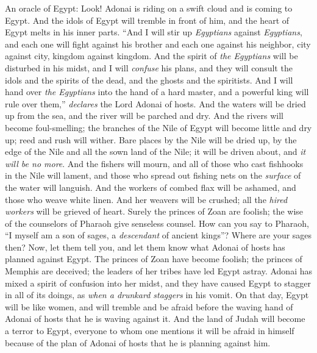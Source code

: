 \begin{biblechapter} %
 An oracle of Egypt:
\verse Look! Adonai is riding on a swift cloud 
and is coming to Egypt. 
And the idols of Egypt will tremble in front of him, 
and the heart of Egypt melts in his inner parts.
\verse “And I will stir up \textit{Egyptians} against \textit{Egyptians}, 
and each one will fight against his brother 
and each one against his neighbor, 
city against city, kingdom against kingdom.
\verse And the spirit of \textit{the Egyptians} will be disturbed in his midst, 
and I will \textit{confuse} his plans, 
and they will consult the idols and the spirits of the dead, 
and the ghosts and the spiritists.
\verse And I will hand over \textit{the Egyptians} into the hand of a hard master, 
and a powerful king will rule over them,” 
\textit{declares} the Lord Adonai of hosts.
\verse And the waters will be dried up from the sea, 
and the river will be parched and dry.
\verse And the rivers will become foul-smelling; 
the branches of the Nile of Egypt will become little and dry up; 
reed and rush will wither.
\verse Bare places by the Nile will be dried up, 
by the edge of the Nile and all the sown land of the Nile; 
it will be driven about, and \textit{it will be no more}.
\verse And the fishers will mourn, 
and all of those who cast fishhooks in the Nile will lament, 
and those who spread out fishing nets on the \textit{surface} of the water will languish.
\verse And the workers of combed flax will be ashamed, 
and those who weave white linen.
\verse And her weavers will be crushed; 
all the \textit{hired workers} will be grieved of heart.
\verse Surely the princes of Zoan are foolish; 
the wise of the counselors of Pharaoh give senseless counsel. 
How can you say to Pharaoh, 
“I myself am a son of sages, 
a \textit{descendant} of ancient kings”?
\verse Where are your sages then? 
Now, let them tell you, 
and let them know what Adonai of hosts has planned against Egypt.
\verse The princes of Zoan have become foolish; 
the princes of Memphis are deceived; 
the leaders of her tribes have led Egypt astray.
\verse Adonai has mixed a spirit of confusion into her midst, 
and they have caused Egypt to stagger in all of its doings, 
as \textit{when a drunkard staggers} in his vomit.
 On that day, Egypt will be like women, and will tremble and be afraid before the waving hand of Adonai of hosts that he is waving against it.
\verse And the land of Judah will become a terror to Egypt, everyone to whom one mentions it will be afraid in himself because of the plan of Adonai of hosts that he is planning against him.

\end{biblechapter}
